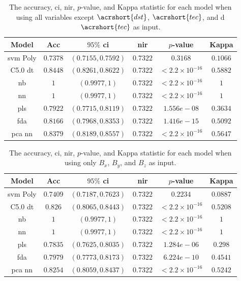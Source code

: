 \documentclass[sn-mathphys-num]{sn-jnl}%
\begin{document}
\begin{table}[!ht]
    \centering
    \caption{The accuracy, \acrshort{ci}, \acrshort{nir}, $p$-value, and Kappa statistic for each model when using all variables except $\acrshort{dst}$, $\acrshort{tec}$, and d$\acrshort{tec}$ as input.}
	\label{tab:stats:reverse:no_TotalElectronContent}
	\begin{tabular}{|c|c|c|c|c|c|}
		\hline
		Model & Acc & $95\%$ \acrshort{ci} & \acrshort{nir} & $p$-value & Kappa \\ \hline
		\acrshort{svm} Poly & $0.7378$ & $(0.7155, 0.7592)$ & $0.7322$ & $0.3168$ & $0.1066$ \\ \hline
		C5.0 \acrshort{dt} & $0.8448$ & $(0.8261, 0.8622)$ & $0.7322$ & $< 2.2 \times {10}^{-16}$ & $0.5882$ \\ \hline
		\acrshort{nb} & $1$ & $(0.9977, 1)$ & $0.7322$ & $< 2.2 \times {10}^{-16}$ & $1$ \\ \hline
		\acrshort{nn} & $1$ & $(0.9977, 1)$ & $0.7322$ & $< 2.2 \times {10}^{-16}$ & $1$ \\ \hline
		\acrshort{pls} & $0.7922$ & $(0.7715, 0.8119)$ & $0.7322$ & $1.556e-08$ & $0.3634$ \\ \hline
		\acrshort{fda} & $0.8166$ & $(0.7968, 0.8353)$ & $0.7322$ & $1.416e-15$ & $0.5092$ \\ \hline
		\acrshort{pca} \acrshort{nn} & $0.8379$ & $(0.8189, 0.8557)$ & $0.7322$ & $< 2.2 \times {10}^{-16}$ & $0.5647$ \\ \hline
	\end{tabular}
\end{table}

\begin{table}[!ht]
    \centering
    \caption{The accuracy, \acrshort{ci}, \acrshort{nir}, $p$-value, and Kappa statistic for each model when using only $B_{x}$, $B_{y}$, and $B_{z}$ as input.}
	\label{tab:stats:reverse:coord}
	\begin{tabular}{|c|c|c|c|c|c|}
		\hline
		Model & Acc & $95\%$ \acrshort{ci} & \acrshort{nir} & $p$-value & Kappa \\ \hline
		\acrshort{svm} Poly & $0.7409$ & $(0.7187, 0.7623)$ & $0.7322$ & $0.2234$ & $0.0887$ \\ \hline
		C5.0 \acrshort{dt} & $0.826$ & $(0.8065, 0.8443)$ & $0.7322$ & $< 2.2 \times {10}^{-16}$ & $0.5208$ \\ \hline
		\acrshort{nb} & $1$ & $(0.9977, 1)$ & $0.7322$ & $< 2.2 \times {10}^{-16}$ & $1$ \\ \hline
		\acrshort{nn} & $1$ & $(0.9977, 1)$ & $0.7322$ & $< 2.2 \times {10}^{-16}$ & $1$ \\ \hline
		\acrshort{pls} & $0.7835$ & $(0.7625, 0.8035)$ & $0.7322$ & $1.284e-06$ & $0.298$ \\ \hline
		\acrshort{fda} & $0.7979$ & $(0.7773, 0.8173)$ & $0.7322$ & $6.224e-10$ & $0.4541$ \\ \hline
		\acrshort{pca} \acrshort{nn} & $0.8254$ & $(0.8059, 0.8437)$ & $0.7322$ & $< 2.2 \times {10}^{-16}$ & $0.5242$ \\ \hline
	\end{tabular}
\end{table}
\end{document}
